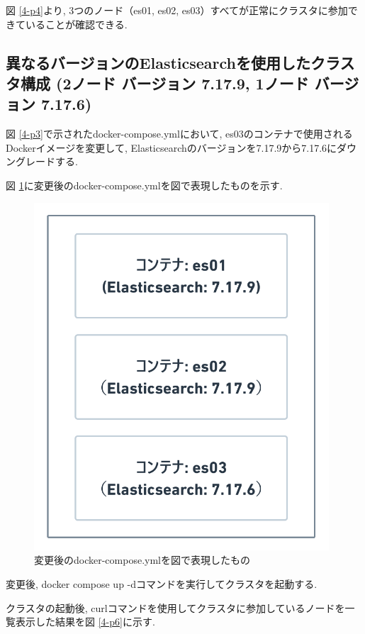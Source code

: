 図 \ref{4-p4}より, 3つのノード（es01, es02, es03）すべてが正常にクラスタに参加できていることが確認できる.

\subsection{異なるバージョンのElasticsearchを使用したクラスタ構成 (2ノード バージョン 7.17.9, 1ノード バージョン 7.17.6)}

図 \ref{4-p3}で示されたdocker-compose.ymlにおいて, es03のコンテナで使用されるDockerイメージを変更して, Elasticsearchのバージョンを7.17.9から7.17.6にダウングレードする.

図 \ref{4-p5}に変更後のdocker-compose.ymlを図で表現したものを示す.

\begin{figure}[H]
  \begin{center}
    \includegraphics[width=110mm]{sotu/figure/2-7.19.9-and-1-7.17.6.png}
    \caption{変更後のdocker-compose.ymlを図で表現したもの}
    \label{4-p5}
  \end{center}
\end{figure}

変更後, docker compose up -dコマンドを実行してクラスタを起動する.

クラスタの起動後, curlコマンドを使用してクラスタに参加しているノードを一覧表示した結果を図 \ref{4-p6}に示す.

